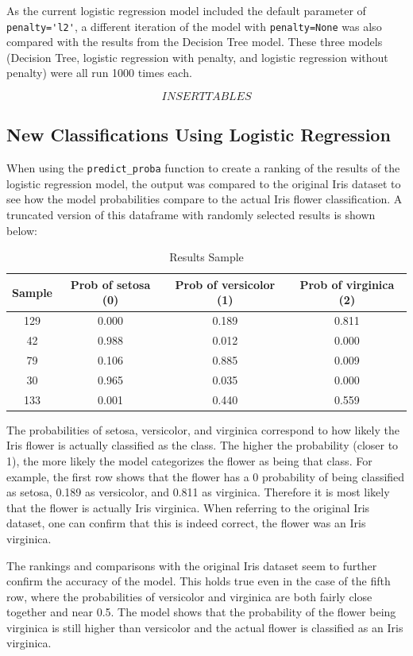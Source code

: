 \documentclass[journal]{IEEEtran}
\begin{document}
As the current logistic regression model included the default parameter of \lstinline{penalty='l2'}, a different iteration of the model with \lstinline{penalty=None} was also compared with the results from the Decision Tree model. These three models (Decision Tree, logistic regression with penalty, and logistic regression without penalty) were all run 1000 times each. 

\[INSERTTABLES\]

\subsection{New Classifications Using Logistic Regression}
When using the \lstinline{predict_proba} function to create a ranking of the results of the logistic regression model, the output was compared to the original Iris dataset to see how the model probabilities compare to the actual Iris flower classification. A truncated version of this dataframe with randomly selected results is shown below:

\begin{table}[h!]
\centering
\begin{tabular}{ c | c c c }
Sample & Prob of setosa (0) &	Prob of versicolor (1) & Prob of virginica (2) \\ 
\hline
129	& 0.000	& 0.189	& 0.811 \\
42	& 0.988	& 0.012	& 0.000 \\
79	& 0.106	& 0.885	& 0.009 \\
30	& 0.965	& 0.035	& 0.000 \\
133	& 0.001	& 0.440	& 0.559
\end{tabular}
\caption{Results Sample}
\label{table:model-comparison-table}
\end{table}

The probabilities of setosa, versicolor, and virginica correspond to how likely the Iris flower is actually classified as the class. The higher the probability (closer to 1), the more likely the model categorizes the flower as being that class. For example, the first row shows that the flower has a 0 probability of being classified as setosa, 0.189 as versicolor, and 0.811 as virginica. Therefore it is most likely that the flower is actually Iris virginica. When referring to the original Iris dataset, one can confirm that this is indeed correct, the flower was an Iris virginica. 

The rankings and comparisons with the original Iris dataset seem to further confirm the accuracy of the model. This holds true even in the case of the fifth row, where the probabilities of versicolor and virginica are both fairly close together and near 0.5. The model shows that the probability of the flower being virginica is still higher than versicolor and the actual flower is classified as an Iris virginica. 
\end{document}
